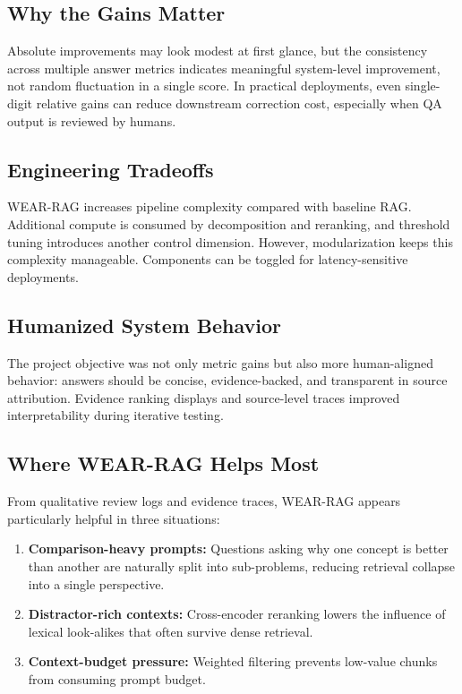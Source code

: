 \documentclass[10pt,draftclsnofoot,onecolumn,journal]{IEEEtran}
\begin{document}
\subsection{Why the Gains Matter}
Absolute improvements may look modest at first glance, but the consistency across multiple answer metrics indicates meaningful system-level improvement, not random fluctuation in a single score. In practical deployments, even single-digit relative gains can reduce downstream correction cost, especially when QA output is reviewed by humans.

\subsection{Engineering Tradeoffs}
WEAR-RAG increases pipeline complexity compared with baseline RAG. Additional compute is consumed by decomposition and reranking, and threshold tuning introduces another control dimension. However, modularization keeps this complexity manageable. Components can be toggled for latency-sensitive deployments.

\subsection{Humanized System Behavior}
The project objective was not only metric gains but also more human-aligned behavior: answers should be concise, evidence-backed, and transparent in source attribution. Evidence ranking displays and source-level traces improved interpretability during iterative testing.

\subsection{Where WEAR-RAG Helps Most}
From qualitative review logs and evidence traces, WEAR-RAG appears particularly helpful in three situations:
\begin{enumerate}
\item \textbf{Comparison-heavy prompts:} Questions asking why one concept is better than another are naturally split into sub-problems, reducing retrieval collapse into a single perspective.
\item \textbf{Distractor-rich contexts:} Cross-encoder reranking lowers the influence of lexical look-alikes that often survive dense retrieval.
\item \textbf{Context-budget pressure:} Weighted filtering prevents low-value chunks from consuming prompt budget.
\end{enumerate}
\end{document}
